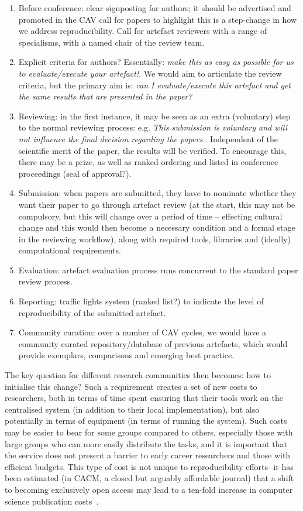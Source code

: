 \documentclass{llncs}
\begin{document}
\begin{enumerate}
\item Before conference: clear signposting for authors; it should be
advertised and promoted in the CAV call for papers to highlight this
is a step-change in how we address reproducibility. Call for artefact
reviewers with a range of specialisms, with a named chair of the review team.
\item Explicit criteria for authors? Essentially: {\emph{make this as
easy as possible for us to evaluate/execute your artefact!}}. We would
aim to articulate the review criteria, but the primary aim is: {\emph{can I evaluate/execute this
  artefact and get the same results that are presented in the paper?}}
\item Reviewing: in the first instance, it may be seen as an extra
(voluntary) step to the normal reviewing process: e.g. {\emph{This
submission is voluntary and will not influence the final decision
regarding the papers.}}. Independent of the scientific merit of the
paper, the results will be verified. To encourage this, there may be a
prize, as well as ranked ordering and listed in conference proceedings
(seal of approval?).
\item Submission: when papers are submitted, they have to nominate whether they
  want their paper to go through artefact review (at the start, this
  may not be compulsory, but this will change over a period of
time -- effecting cultural change and this would then become a
necessary condition and a formal stage in the reviewing workflow),
  along with required tools, libraries and (ideally) computational requirements.
\item Evaluation: artefact evaluation process runs concurrent to the
  standard paper review process.
\item Reporting: traffic lights system (ranked list?) to indicate the level of
  reproducibility of the submitted artefact. 
\item Community curation: over a number of CAV cycles, we would have a
  community curated repository/database of previous artefacts, which
  would provide exemplars, comparisons and emerging best practice.
\end{enumerate}

The key question for different research communities then becomes: how
to initialise this change? Such a requirement creates a set of new
costs to researchers, both in terms of time spent ensuring that their
tools work on the centralised system (in addition to their local
implementation), but also potentially in terms of equipment (in terms
of running the system). Such costs may be easier to bear for some
groups compared to others, especially those with large groups who can
more easily distribute the tasks, and it is important that the service
does not present a barrier to early career researchers and those with
efficient budgets. This type of cost is not unique to reproducibility
efforts- it has been estimated (in CACM, a closed but arguably
affordable journal) that a shift to becoming exclusively open access
may lead to a ten-fold increase in computer science publication
costs~\cite{vardi-cacm-2014}. 
\end{document}
